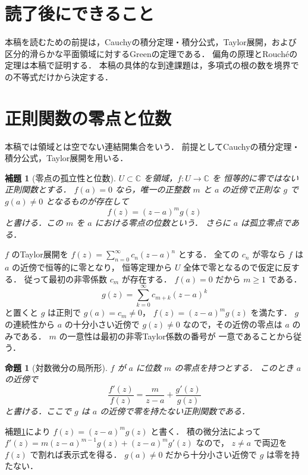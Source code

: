 \documentclass[a5paper,10pt,onecolumn]{jsarticle}
\makeatletter
\theoremstyle{mathnotetheorem}
\newtheorem{lemma}[theorem]{補題}
\newtheorem{proposition}[theorem]{命題}
\renewcommand{\proofname}{証明}
\renewenvironment{proof}[1][\proofname]{%
  \par\pushQED{\qed}\normalfont\topsep4\p@\@plus2\p@\relax
  \trivlist\item[\hskip\labelsep\bfseries #1]\ignorespaces
}{\popQED\endtrivlist\@endpefalse}
\makeatother
\begin{document}
\section*{読了後にできること}
本稿を読むための前提は，Cauchyの積分定理・積分公式，Taylor展開，および区分的滑らかな平面領域に対するGreenの定理である．
偏角の原理とRouchéの定理は本稿で証明する．
本稿の具体的な到達課題は，多項式の根の数を境界での不等式だけから決定する．

\section{正則関数の零点と位数}

本稿では領域とは空でない連結開集合をいう．
前提としてCauchyの積分定理・積分公式，Taylor展開を用いる．

\begin{lemma}[零点の孤立性と位数]\label{lem:zero-order}
$U\subset\mathbb C$ を領域，$f:U\to\mathbb C$ を
恒等的に零ではない正則関数とする．
$f(a)=0$ なら，唯一の正整数 $m$ と
$a$ の近傍で正則な $g$ で $g(a)\ne0$ となるものが存在して
\[
 f(z)=(z-a)^m g(z)
\]
と書ける．この $m$ を $a$ における零点の位数という．
さらに $a$ は孤立零点である．
\end{lemma}
\begin{proof}
$f$ のTaylor展開を
$f(z)=\sum_{n=0}^\infty c_n(z-a)^n$ とする．
全ての $c_n$ が零なら $f$ は $a$ の近傍で恒等的に零となり，
恒等定理から $U$ 全体で零となるので仮定に反する．
従って最初の非零係数 $c_m$ が存在する．
$f(a)=0$ だから $m\ge1$ である．
\[
 g(z)=\sum_{k=0}^\infty c_{m+k}(z-a)^k
\]
と置くと $g$ は正則で $g(a)=c_m\ne0$，
$f(z)=(z-a)^m g(z)$ を満たす．
$g$ の連続性から $a$ の十分小さい近傍で
$g(z)\ne0$ なので，その近傍の零点は $a$ のみである．
$m$ の一意性は最初の非零Taylor係数の番号が
一意であることから従う．
\end{proof}

\begin{proposition}[対数微分の局所形]\label{prop:log-der}
$f$ が $a$ に位数 $m$ の零点を持つとする．
このとき $a$ の近傍で
\[
 \frac{f'(z)}{f(z)}
 =\frac{m}{z-a}+\frac{g'(z)}{g(z)}
\]
と書ける．ここで $g$ は $a$ の近傍で零を持たない正則関数である．
\end{proposition}
\begin{proof}
補題\ref{lem:zero-order}により
$f(z)=(z-a)^mg(z)$ と書く．
積の微分法によって
$f'(z)=m(z-a)^{m-1}g(z)+(z-a)^mg'(z)$ なので，
$z\ne a$ で両辺を $f(z)$ で割れば表示式を得る．
$g(a)\ne0$ だから十分小さい近傍で $g$ は零を持たない．
\end{proof}
\end{document}
